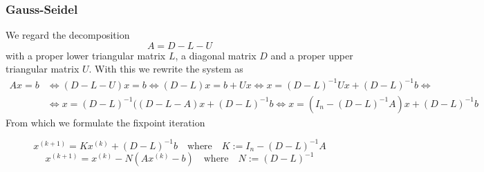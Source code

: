 \subsubsection{Gauss-Seidel}
We regard the decomposition
\[A = D - L - U\]
with a proper lower triangular matrix \(L\), a diagonal matrix \(D\) and a proper upper triangular matrix \(U\).
With this we rewrite the system as
\begin{equation*}
   \begin{split}
      Ax = b & \iff (D - L - U)x = b \iff (D - L)x = b + Ux \iff x = (D - L)^{-1}Ux + (D - L)^{-1}b \iff \\
             & \iff x = (D - L)^{-1}((D - L - A)x + (D - L)^{-1}b \iff x = (I_n - (D - L)^{-1}A)x + (D - L)^{-1}b
   \end{split}
\end{equation*}
From which we formulate the fixpoint iteration
\begin{definition}
   \[x^{(k+1)} = Kx^{(k)} + (D - L)^{-1}b \quad\text{where}\quad K := I_n - (D - L)^{-1}A\]
   \[x^{(k+1)} = x^{(k)} - N(Ax^{(k)} - b) \quad\text{where}\quad N := (D - L)^{-1}\]
\end{definition}

